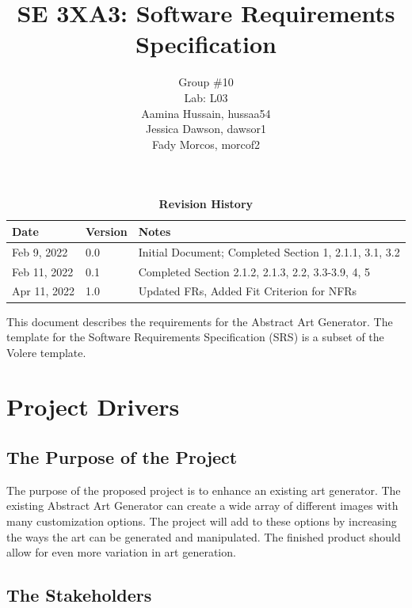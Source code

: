 \documentclass[12pt, titlepage]{article}
\title{SE 3XA3: Software Requirements Specification}
\author{Group \#10
        \\Lab: L03
		\\ Aamina Hussain, hussaa54
		\\ Jessica Dawson, dawsor1
		\\ Fady Morcos, morcof2
}
\date{}
\begin{document}
\maketitle

\tableofcontents
\listoftables
\listoffigures

\begin{table}[h!]
\caption{\bf Revision History}
\begin{tabularx}{\textwidth}{p{3cm}p{2cm}X}
\toprule {\bf Date} & {\bf Version} & {\bf Notes}\\
\midrule
Feb 9, 2022 & 0.0 & Initial Document; Completed Section 1, 2.1.1, 3.1, 3.2\\
Feb 11, 2022 & 0.1 & Completed Section 2.1.2, 2.1.3, 2.2, 3.3-3.9, 4, 5\\
\color{red}Apr 11, 2022 & \color{red}1.0 & \color{red}Updated FRs, Added Fit Criterion for NFRs\\
\bottomrule
\end{tabularx}
\end{table}

\clearpage



This document describes the requirements for the Abstract Art Generator. The template for the Software
Requirements Specification (SRS) is a subset of the Volere template.%

\section{Project Drivers}

\subsection{The Purpose of the Project}

The purpose of the proposed project is to enhance an existing art generator. The existing Abstract Art Generator can create a wide array of different images with many customization options. The project will add to these options by increasing the ways the art can be generated and manipulated. The finished product should allow for even more variation in art generation.

\subsection{The Stakeholders}
\end{document}
